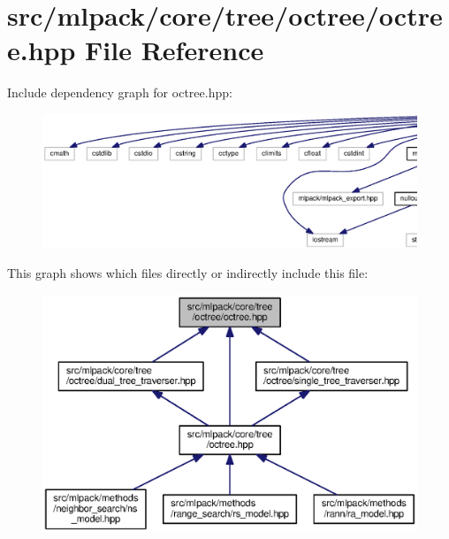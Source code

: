 \section{src/mlpack/core/tree/octree/octree.hpp File Reference}
\label{octree_2octree_8hpp}
Include dependency graph for octree.\+hpp\+:
\nopagebreak
\begin{figure}[H]
\begin{center}
\leavevmode
\includegraphics[width=350pt]{octree_2octree_8hpp__incl}
\end{center}
\end{figure}
This graph shows which files directly or indirectly include this file\+:
\nopagebreak
\begin{figure}[H]
\begin{center}
\leavevmode
\includegraphics[width=350pt]{octree_2octree_8hpp__dep__incl}
\end{center}
\end{figure}
